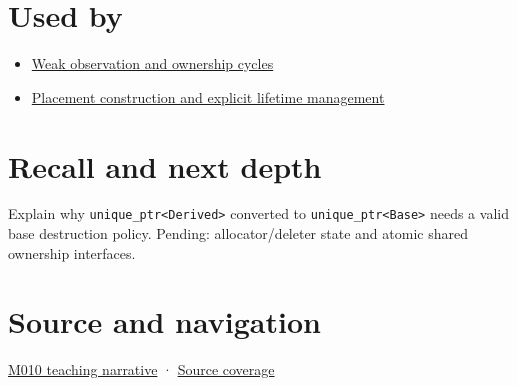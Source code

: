 \section{Used by}\label{appendix-51602cabe815-used-by}

\begin{itemize}
\tightlist
\item
  \hyperref[appendix-b9548675eb2b]{Weak observation and ownership cycles}
\item
  \hyperref[appendix-f56c3e43fd4e]{Placement construction and explicit lifetime management}
\end{itemize}

\section{Recall and next depth}\label{appendix-51602cabe815-recall-and-next-depth}

Explain why \texttt{unique\_ptr\textless{}Derived\textgreater{}} converted to \texttt{unique\_ptr\textless{}Base\textgreater{}} needs a valid base destruction policy. Pending: allocator/deleter state and atomic shared ownership interfaces.

\section{Source and navigation}\label{appendix-51602cabe815-source-and-navigation}

\href{Continuous\%20Notes/Computing\%20Foundations\%20-\%20From\%20Bits\%20to\%20C++\%20and\%20Systems\%20APIs\#Exclusive\%20ownership:\%20\%60unique_ptr\%60\%20makes\%20transfer\%20visible}{M010 teaching narrative} · \hyperref[appendix-fd090d982a15-m010---parts-148-160]{Source coverage}
